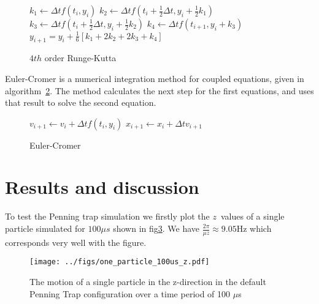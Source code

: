 \documentclass[english,notitlepage,reprint,nofootinbib]{revtex4-1}  %
\begin{document}
%
\begin{figure}
	\begin{algorithm}[H]
		\caption{$4th$ order Runge-Kutta}
		\label{algo:rk4}
		\begin{algorithmic}
			\State $k_1 \leftarrow \Delta t f(t_i, y_i)$  
			\State $k_2 \leftarrow \Delta t f(t_i + \frac{1}{2}\Delta t, y_i + \frac{1}{2}k_1)$
			\State $k_3 \leftarrow \Delta t f(t_i + \frac{1}{2}\Delta t, y_i + \frac{1}{2}k_2) $
			\State $k_4 \leftarrow \Delta t f(t_{i+1}, y_i + k_3)$
			\State $y_{i+1} = y_i + \frac{1}{6}[k_1 + 2k_2 + 2k_3 + k_4]$
			\EndProcedure
		\end{algorithmic}
	\end{algorithm}
\end{figure}
Euler-Cromer\cite{euler-cromer} is a numerical integration method for coupled equations, given in algorithm~\ref{algo:ec}. The method calculates the next step for the first equations, and uses that result to solve the second equation.
\begin{figure}
	\begin{algorithm}[H]
		\caption{Euler-Cromer}
		\label{algo:ec}
		\begin{algorithmic}
			\Procedure{EC}{$v, x, \Delta t, f$}
			\State $v_{i+1} \leftarrow v_i + \Delta t f(t_i, y_i)$
			\State $x_{i+1} \leftarrow x_i + \Delta t v_{i+1}$
			\EndProcedure
		\end{algorithmic}
	\end{algorithm}
\end{figure}

\section{Results and discussion}\label{sec:results}
%
To test the Penning trap simulation we firstly plot the $z$ values of a single particle simulated for $100 \mu s$ shown in fig\ref{fig:100us-z}. We have $\frac{2 \pi}{\mu z} \approx 9.05$Hz which corresponds very well with the figure.

\begin{figure}[H]
	\centering
	\texttt{[image: ../figs/one\_particle\_100us\_z.pdf]} %
	\caption{The motion of a single particle in the z-direction in the default Penning Trap configuration over a time period of 100 $\mu$s}
	\label{fig:100us-z}
\end{figure}
\end{document}
